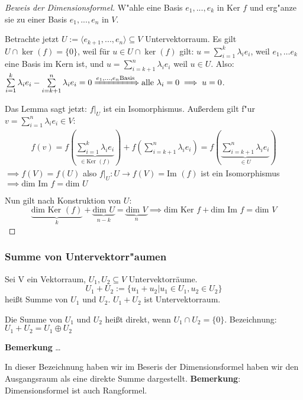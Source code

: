 \documentclass[11pt]{article}
\newcommand{\mdim}{\text{dim }}
\newcommand{\mKer}{\text{Ker }}
\newcommand{\mIm}{\text{Im }}
\begin{document}
\begin{proof}[Beweis der Dimensionsformel] \label{}
W"ahle eine Basis \({e_1, ..., e_k}\) in \(\mKer f\) und erg"anze sie zu einer Basis
\({e_1, ..., e_n}\) in \(V\).

Betrachte jetzt \(U:=\langle e_{k+1}, ..., e_n\rangle \subseteq V\) Untervektorraum. Es gilt $U \cap \ker(f) = \{0\}$, weil für $u\in U \cap \ker(f)$ gilt: \(u = \sum\limits_{i=1}^k \lambda_ie_i \), weil \(e_1, \dots e_k\) eine Basis im Kern ist, und \(u = \sum\limits_{i=k+1}^{n} \lambda_i e_i\) weil \(u\in U\). Also: \(\sum\limits_{i=1}^k \lambda_ie_i - \sum\limits_{i=k+1}^{n} \lambda_ie_i = 0 \xRightarrow{e_1,\dots, e_n \text{Basis}} \text{alle }\lambda_i = 0 \implies u =0\).

Das Lemma sagt jetzt: \(f|_U\) ist ein Isomorphismus. Außerdem gilt f"ur \(v =\sum\limits_{i=1}^{n}\lambda_ie_i \in V:\)
\begin{align*}
f(v) = f\left(\underbrace{\sum_{i=1}^{k}\lambda_ie_i}_{\in \mKer(f)}\right) + f\left(\sum_{i=k+1}^{n}\lambda_ie_i\right) = f\left(\underbrace{\sum_{i=k+1}^{n} \lambda_ie_i}_{\in U}\right)
\end{align*}
\(\implies f(V)=f(U)\) also \(f|_U : U\to f(V) = \mIm(f) \) ist ein Isomorphismus \(\implies \mdim \mIm f = \mdim U \)

Nun gilt nach Konstruktion von \(U\): \[\underbrace{\mdim \mKer(f)}_{k} + \underbrace{\mdim U}_{n-k} = \underbrace{\mdim V}_{n} \implies \mdim\mKer f + \mdim\mIm f = \mdim V \]
\end{proof}

\subsubsection{Summe von Untervektorr"aumen}
\label{sec:org83dfe63}
\begin{definition}{}{}
	Sei V ein Vektorraum, $U_1, U_2 \subseteq V$ Untervektorräume.
	\[U_1 + U_2 := \{u_1+u_2 | u_1 \in U_1, u_2 \in U_2\}\]
	heißt Summe von $U_1$ und $U_2$.
	$U_1 + U_2$ ist Untervektorraum.
	
\end{definition}
\begin{definition}{}{}
Die Summe von $U_1$ und $U_2$ heißt direkt, wenn $U_1 \cap U_2 = \{0\}$. Bezeichnung: $U_1 + U_2 = U_1 \oplus U_2$
\end{definition}

\textbf{Bemerkung} \ldots{}

In dieser Bezeichnung haben wir im Beseris der Dimensionsformel haben wir den
Ausgangsraum als eine direkte Summe dargestellt. 
\textbf{Bemerkung}: Dimensionsformel ist auch Rangformel.
\end{document}
